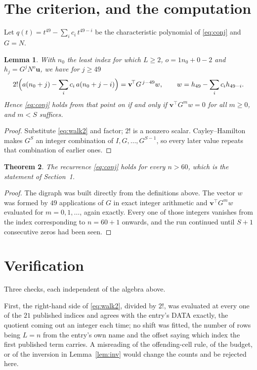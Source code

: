 \documentclass[11pt,a4paper]{article}
\theoremstyle{plain}
\newtheorem{theorem}{Theorem}
\newtheorem{lemma}[theorem]{Lemma}
\theoremstyle{definition}
\begin{document}
\section{The criterion, and the computation}

Let $q(t)=t^{49}-\sum_i c_i\,t^{49-i}$ be the characteristic polynomial of
\eqref{eq:conj} and $G=N$.

\begin{lemma}\label{lem:crit}
With $n_0$ the least index for which $L\ge2$, $o=1n_0+0-2$ and
$h_j=G^{j}N^{o}\mathbf{u}$, we have for $j\ge49$
\[
2!\Bigl(a(n_0+j)-\sum_i c_i\,a(n_0+j-i)\Bigr)=\mathbf{v}^{\!\top}G^{\,j-49}w,
\qquad w=h_{49}-\sum_i c_i h_{49-i} .
\]
Hence \eqref{eq:conj} holds from that point on if and only if
$\mathbf{v}^{\!\top}G^{m}w=0$ for all $m\ge0$, and $m<S$ suffices.
\end{lemma}

\begin{proof}
Substitute \eqref{eq:walk2} and factor; $2!$ is a nonzero scalar. Cayley--Hamilton
makes $G^{S}$ an integer combination of $I,G,\dots,G^{S-1}$, so every later value repeats
that combination of earlier ones.
\end{proof}

\begin{theorem}
The recurrence \eqref{eq:conj} holds for every $n>60$, which is the statement of
Section~1.
\end{theorem}

\begin{proof}
The digraph was built directly from the definitions above. The vector $w$ was formed by
$49$ applications of $G$ in exact integer arithmetic and $\mathbf{v}^{\!\top}G^{m}w$
evaluated for $m=0,1,\dots$, again exactly. Every one of those integers vanishes from the
index corresponding to $n=60+1$ onwards, and the run continued until $S+1$ consecutive
zeros had been seen.
\end{proof}

\section{Verification}

Three checks, each independent of the algebra above.

First, the right-hand side of \eqref{eq:walk2}, divided by $2!$, was evaluated at every
one of the $21$ published indices and agrees with the entry's DATA exactly, the quotient
coming out an integer each time; no shift was fitted, the number of rows being
$L=n$ from the entry's own name and the offset saying which index the first published
term carries. A misreading of the offending-cell rule, of the budget, or of the inversion in
Lemma~\ref{lem:inv} would change the counts and be rejected here.
\end{document}
